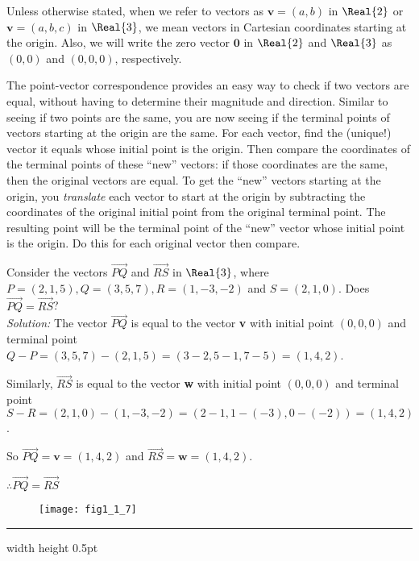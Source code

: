 Unless otherwise stated, when we refer to vectors as $\textbf{v} = (a,b)$ in $\Real{2}$ or $\textbf{v} = (a,b,c)$
in $\Real{3}$, we mean vectors in Cartesian coordinates starting at the origin.  Also, we will write
the zero vector $\textbf{0}$ in $\Real{2}$ and $\Real{3}$ as $(0,0)$ and $(0,0,0)$, respectively.

The point-vector correspondence provides an easy way to check if two vectors are
equal, without having to determine their magnitude and direction.  Similar to seeing if two points are the same, you are
now seeing if the terminal points of vectors starting at the origin are the same.  For each vector, find the
(unique!) vector it equals whose initial point is the origin.  Then compare the coordinates of the terminal points of
these ``new'' vectors: if those coordinates are the same, then the original vectors are equal.  To get the ``new''
vectors starting at the origin, you \emph{translate}
each vector to start at the origin by subtracting the coordinates of the original
initial point from the original terminal point.  The resulting point will be the terminal point of
the ``new'' vector whose initial point is the origin.  Do this for each original vector then compare.

\begin{exmp}
 Consider the vectors $\overrightarrow{PQ}$ and $\overrightarrow{RS}$ in $\Real{3}$, where $P = (2,1,5),
 Q = (3,5,7), R = (1,-3,-2)$ and $S = (2,1,0)$.  Does $\overrightarrow{PQ} =
 \overrightarrow{RS}$?\\\emph{Solution:}
 The vector $\overrightarrow{PQ}$ is equal to the vector \textbf{v} with
 initial point $(0,0,0)$ and terminal point $Q - P = (3,5,7) - (2,1,5) = (3 - 2,5 - 1,7 - 5) = (1,4,2)$.
 \par\noindent
 Similarly, $\overrightarrow{RS}$ is equal to the vector \textbf{w} with
 initial point $(0,0,0)$ and terminal point $S - R = (2,1,0) - (1,-3,-2) = (2 - 1, 1 - (-3),0 - (-2)) = (1,4,2)$.
 \par\noindent
 So $\overrightarrow{PQ} = \textbf{v} = (1,4,2)$ and $\overrightarrow{RS} = \textbf{w} = (1,4,2)$.
 \par\noindent
 $\therefore \overrightarrow{PQ} = \overrightarrow{RS}$
\end{exmp}
\begin{figure}[h]
 \begin{center}
  \texttt{[image: fig1\_1\_7]}
 \end{center}
 \caption[]{}
 \label{fig:ex1.2}
\end{figure}
\hrule width \textwidth height 0.5pt
\vspace{4mm}

